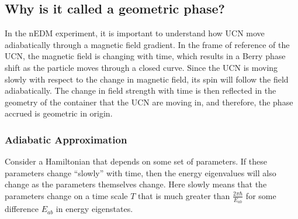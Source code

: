 \subsection{Why is it called a geometric phase?}

In the nEDM experiment, it is important to understand how UCN move
adiabatically through a magnetic field gradient.  In the frame of
reference of the UCN, the magnetic field is changing with time, which
results in a Berry phase shift as the particle moves through a closed
curve. Since the UCN is moving slowly with respect to the change in
magnetic field, its spin will follow the field adiabatically.  The
change in field strength with time is then reflected in the geometry
of the container that the UCN are moving in, and therefore, the phase
accrued is geometric in origin.
 

\subsubsection{Adiabatic Approximation}
Consider a Hamiltonian that depends on some set of parameters. If
these parameters change ``slowly'' with time, then the energy
eigenvalues will also change as the parameters themselves change. Here
slowly means that the parameters change on a time scale $T$ that is much
greater than $\frac{2\pi \hbar}{E_{ab}}$ for some difference $E_{ab}$
in energy eigenstates.

